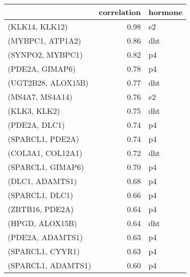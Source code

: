 \begin{tabular}{lrl}
\toprule
{} &  correlation & hormone \\
\midrule
(KLK14, KLK12)     &         0.98 &      e2 \\
(MYBPC1, ATP1A2)   &         0.86 &     dht \\
(SYNPO2, MYBPC1)   &         0.82 &      p4 \\
(PDE2A, GIMAP6)    &         0.78 &      p4 \\
(UGT2B28, ALOX15B) &         0.77 &     dht \\
(MS4A7, MS4A14)    &         0.76 &      e2 \\
(KLK3, KLK2)       &         0.75 &     dht \\
(PDE2A, DLC1)      &         0.74 &      p4 \\
(SPARCL1, PDE2A)   &         0.74 &      p4 \\
(COL3A1, COL12A1)  &         0.72 &     dht \\
(SPARCL1, GIMAP6)  &         0.70 &      p4 \\
(DLC1, ADAMTS1)    &         0.68 &      p4 \\
(SPARCL1, DLC1)    &         0.66 &      p4 \\
(ZBTB16, PDE2A)    &         0.64 &      p4 \\
(HPGD, ALOX15B)    &         0.64 &     dht \\
(PDE2A, ADAMTS1)   &         0.63 &      p4 \\
(SPARCL1, CYYR1)   &         0.63 &      p4 \\
(SPARCL1, ADAMTS1) &         0.60 &      p4 \\
\bottomrule
\end{tabular}

